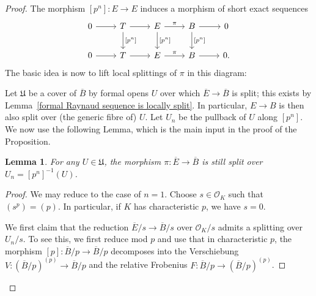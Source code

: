 \documentclass[10pt,oneside]{amsart}
\newtheorem{lemma}[theorem]{Lemma}
\theoremstyle{definition}
\renewcommand{\O}{\mathcal{O}}
\begin{document}
	\begin{proof}
	The morphism $[p^n]:E\to E$ induces a morphism of short exact sequences
			\begin{equation}\label{eq:split-diag}
				\begin{tikzcd}[row sep = {1.2cm,between origins}]
				0 \arrow[r] & T \arrow[r] \arrow[d, "{[p^n]}"] & E \arrow[r,"\pi"] \arrow[d, "{[p^n]}"] & B \arrow[d,"{[p^n]}"] \arrow[r] & 0 \\
				0 \arrow[r] & T \arrow[r] & E \arrow[r,"\pi"] & B \arrow[r] & 0.
				\end{tikzcd}
				\end{equation}
			The basic idea is now to lift local splittings of $\pi$ in this diagram:
			
			 Let $\mathfrak U$ be a cover of $\overline{B}$ by formal opens $U$ over which $\overline{E}\to \overline{B}$ is split; this exists by Lemma~\ref{formal Raynaud sequence is locally split}. In particular, $E\to B$ is then also split over (the generic fibre of) $U$.
			 Let $U_n$ be the pullback of $U$ along $[p^n]$. 
		We now use the following Lemma, which is the main input in the proof of the Proposition.
		\begin{lemma}
			For any $U\in \mathfrak U$, the morphism $\pi:\overline{E}\to \overline{B}$ is still split over $U_n=[p^n]^{-1}(U)$.
		\end{lemma}
		\begin{proof}
			We may reduce to the case of $n=1$.
			Choose $s\in \O_K$ such that $(s^p)=(p)$. In particular, if $K$ has characteristic $p$, we have $s=0$.
			
			We first claim that the reduction $\overline{E}/s\to \overline{B}/s$ over $\O_K/s$ admits a splitting over $U_n/s$.
			To see this, we first reduce mod $p$ and use that in characteristic $p$, the morphism $[p]:\overline{B}/p\to \overline{B}/p$ decomposes into the Verschiebung $V:(\overline{B}/p)^{(p)}\to \overline{B}/p$ and the relative Frobenius $F:\overline{B}/p\to (\overline{B}/p)^{(p)}$.
			

\end{proof}
\end{proof}
\end{document}
